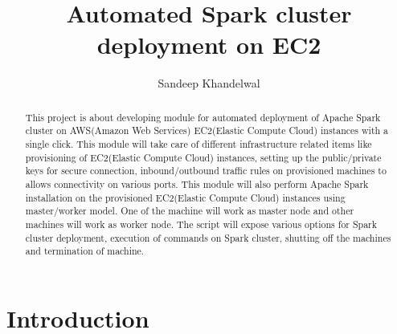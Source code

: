 
\title{Automated Spark cluster deployment on EC2}


\author{Sandeep Khandelwal}


\renewcommand{\shortauthors}{Sandeep}


\begin{abstract}

This project is about developing module for automated deployment of
Apache Spark\cite{hid-sp18-511-www-spark} cluster on AWS(Amazon Web
Services)\cite{hid-sp18-511-www-aws} EC2(Elastic Compute
Cloud)\cite{hid-sp18-511-www-ec2} instances with a single click. This
module will take care of different infrastructure related items like
provisioning of EC2(Elastic Compute Cloud)\cite{hid-sp18-511-www-ec2}
instances, setting up the public/private keys for secure connection,
inbound/outbound traffic rules on provisioned machines to allows
connectivity on various ports. This module will also perform Apache
Spark\cite{hid-sp18-511-www-spark} installation on the provisioned
EC2(Elastic Compute Cloud)\cite{hid-sp18-511-www-ec2} instances using
master/worker model. One of the machine will work as master node and
other machines will work as worker node. The script will expose
various options for Spark cluster deployment, execution of commands on
Spark cluster, shutting off the machines and termination of machine.

\end{abstract}



\maketitle

\section{Introduction}

